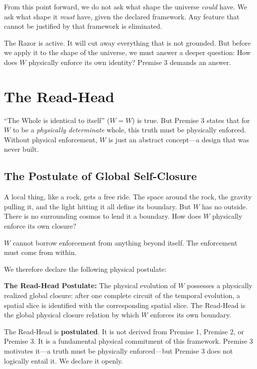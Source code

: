 \documentclass[11pt]{article}
\theoremstyle{canonstyle}
\begin{document}
From this point forward, we do not ask what shape the universe \emph{could} have. We ask what shape it \emph{must} have, given the declared framework. Any feature that cannot be justified by that framework is eliminated.

The Razor is active. It will cut away everything that is not grounded. But before we apply it to the shape of the universe, we must answer a deeper question: How does $W$ physically enforce its own identity? Premise 3 demands an answer.

\newpage

\section{The Read-Head}

``The Whole is identical to itself'' ($W=W$) is true. But Premise 3 states that for $W$ to be a \emph{physically determinate} whole, this truth must be physically enforced. Without physical enforcement, $W$ is just an abstract concept---a design that was never built.

\subsection{The Postulate of Global Self-Closure}

\begin{reflect}[Question 10---What physically enforces $W=W$?]
A local thing, like a rock, gets a free ride. The space around the rock, the gravity pulling it, and the light hitting it all define its boundary. But $W$ has no outside. There is no surrounding cosmos to lend it a boundary. How does $W$ physically enforce its own closure?
\end{reflect}

$W$ cannot borrow enforcement from anything beyond itself. The enforcement must come from within.

We therefore declare the following physical postulate:

\begin{keyresult}
\textbf{The Read-Head Postulate:} The physical evolution of $W$ possesses a physically realized global closure: after one complete circuit of the temporal evolution, a spatial slice is identified with the corresponding spatial slice. The Read-Head is the global physical closure relation by which $W$ enforces its own boundary.
\end{keyresult}

The Read-Head is \textbf{postulated}. It is not derived from Premise 1, Premise 2, or Premise 3. It is a fundamental physical commitment of this framework. Premise 3 motivates it---a truth must be physically enforced---but Premise 3 does not logically entail it. We declare it openly.
\end{document}
